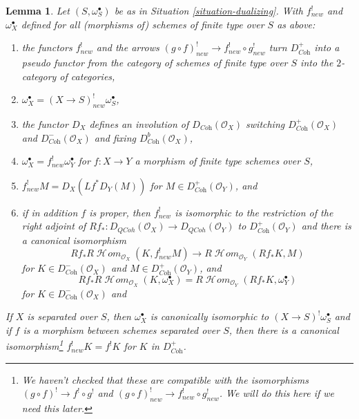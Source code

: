 \documentclass{stacks-project}
\theoremstyle{plain}
\newtheorem{lemma}[subsection]{Lemma}
\theoremstyle{definition}
\theoremstyle{remark}
\numberwithin{equation}{subsection}
\def\SheafHom{\mathop{\mathcal{H}\!\mathit{om}}\nolimits}
\def\QCoh{\mathit{QCoh}}
\begin{document}
\begin{lemma}
\label{lemma-duality-bootstrap}
Let $(S, \omega_S^\bullet)$ be as in Situation \ref{situation-dualizing}.
With $f^!_{new}$ and $\omega_X^\bullet$ defined for all (morphisms of)
schemes of finite type over $S$ as above:
\begin{enumerate}
\item the functors $f^!_{new}$ and the arrows
$(g \circ f)^!_{new} \to f^!_{new} \circ g^!_{new}$
turn $D_{\textit{Coh}}^+$ into a pseudo functor from the category of
schemes of finite type over $S$ into the $2$-category of categories,
\item $\omega_X^\bullet = (X \to S)^!_{new} \omega_S^\bullet$,
\item the functor $D_X$
defines an involution of $D_{\textit{Coh}}(\mathcal{O}_X)$
switching $D_{\textit{Coh}}^+(\mathcal{O}_X)$ and
$D_{\textit{Coh}}^-(\mathcal{O}_X)$ and fixing
$D_{\textit{Coh}}^b(\mathcal{O}_X)$,
\item $\omega_X^\bullet = f^!_{new}\omega_Y^\bullet$ for
$f : X \to Y$ a morphism of finite type schemes over $S$,
\item $f^!_{new}M = D_X(Lf^*D_Y(M))$ for
$M \in D_{\textit{Coh}}^+(\mathcal{O}_Y)$, and
\item if in addition $f$ is proper, then $f^!_{new}$ is isomorphic
to the restriction of the right adjoint of
$Rf_* : D_\QCoh(\mathcal{O}_X) \to D_\QCoh(\mathcal{O}_Y)$ to
$D_{\textit{Coh}}^+(\mathcal{O}_Y)$ and there is a canonical isomorphism
$$
Rf_*R\SheafHom_{\mathcal{O}_X}(K, f^!_{new}M)
\to
R\SheafHom_{\mathcal{O}_Y}(Rf_*K, M)
$$
for $K \in D^-_{\textit{Coh}}(\mathcal{O}_X)$ and
$M \in D_{\textit{Coh}}^+(\mathcal{O}_Y)$, and
$$
Rf_*R\SheafHom_{\mathcal{O}_X}(K, \omega_X^\bullet) =
R\SheafHom_{\mathcal{O}_Y}(Rf_*K, \omega_Y^\bullet)
$$
for $K \in D^-_{\textit{Coh}}(\mathcal{O}_X)$ and
\end{enumerate}
If $X$ is separated over $S$, then
$\omega_X^\bullet$ is canonically isomorphic to
$(X \to S)^!\omega_S^\bullet$ and
if $f$ is a morphism between schemes separated
over $S$, then there is a canonical isomorphism\footnote{We haven't
checked that these are compatible with the isomorphisms
$(g \circ f)^! \to f^! \circ g^!$ and
$(g \circ f)^!_{new} \to f^!_{new} \circ g^!_{new}$. We will do this
here if we need this later.}
$f_{new}^!K = f^!K$ for $K$ in $D_{\textit{Coh}}^+$.
\end{lemma}
\end{document}
